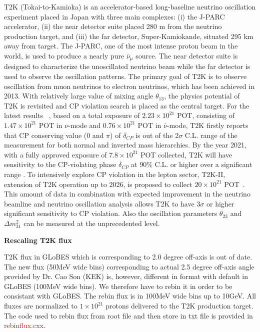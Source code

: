 \documentclass[a4 paper,12pt]{report}%
\begin{document}
 T2K (Tokai-to-Kamioka) \cite{Itow:2001ee} is an accelerator-based long-baseline neutrino oscillation experiment placed in Japan with three main complexes:  (i) the J-PARC accelerator, (ii) the near detector suite placed 280 m from the neutrino production target, and (iii) the far detector, Super-Kamiokande, situated 295 km away from target. The J-PARC, one of the most intense proton beam in the world, is used to produce a nearly pure $\bar{\nu}_{\mu}$ source. The near detector suite is designed to characterize the unoscillated neutrino beam while the far detector is used to observe the oscillation patterns. The primary goal of T2K is to observe oscillation from muon neutrinos to electron neutrinos, which has been achieved in 2013. With relatively large value of mixing angle $\theta_{13}$, the physics potential of T2K is revisited and CP violation search is placed as the central target. For the latest results ~\cite{Cao:201805}, based on a total exposure of $2.23\times 10^{21}$ POT, consisting of $1.47\times10^{21}$ POT in $\nu$-mode and $0.76\times10^{21}$ POT in $\bar{\nu}$-mode, T2K firstly reports that CP conserving value (0 and $\pi$) of $\delta_{CP}$ is out of the 2$\sigma$ C.L. range of the measurement for both normal and inverted mass hierarchies.  By the year 2021, with a fully approved exposure of $7.8 \times 10^{21}$ POT collected, T2K will have sensitivity to the CP-violating phase $\delta_{CP}$ at $90\%$ C.L. or higher over a significant range \cite{Abe:2014tzr}. To intensively explore CP violation in the lepton sector, T2K-II, extension of T2K operation up to 2026, is proposed to collect $20\times 10^{21}$ POT~\cite{Abe:2016tez}. This amount of data in combination with expected improvement in the neutrino beamline and neutrino oscillation analysis allows T2K to have 3$\sigma$ or higher significant sensitivity to CP violation. Also the oscillation parameters $\theta_{23}$ and $\Delta m^2_{31}$ can be measured at the unprecedented level.  \par
\textbf{Rescaling T2K flux}\par 
T2K flux in GLoBES which is corresponding to 2.0 degree off-axis is out of date. The new flux (50MeV wide bins) corresponding to actual 2.5 degree off-axis angle provided by Dr. Cao Son (KEK) is, however, different in format with default in GLoBES (100MeV wide bins). We therefore have to rebin it in order to be consistant with GLoBES. The rebin flux is in 100MeV wide bins up to 10GeV. All fluxes are normalized to $1 \times 10^{21}$ protons delivered to the T2K production target. The code used to rebin flux from root file and then store in txt file is provided in \textcolor{red}{rebinflux.cxx}. \par 
\end{document}
